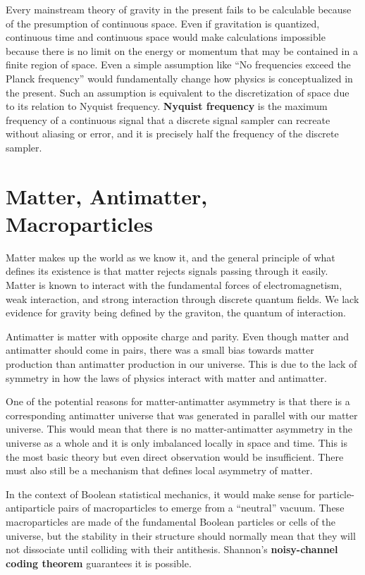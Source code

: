\documentclass[10pt, a5paper, twoside, openright]{memoir}
\begin{document}
Every mainstream theory of gravity in the present fails to be calculable because of the presumption of continuous space. Even if gravitation is quantized, continuous time and continuous space would make calculations impossible because there is no limit on the energy or momentum that may be contained in a finite region of space. Even a simple assumption like ``No frequencies exceed the Planck frequency'' would fundamentally change how physics is conceptualized in the present. Such an assumption is equivalent to the discretization of space due to its relation to Nyquist frequency. \textbf{Nyquist frequency} is the maximum frequency of a continuous signal that a discrete signal sampler can recreate without aliasing or error, and it is precisely half the frequency of the discrete sampler.

\section{Matter, Antimatter, Macroparticles}
Matter makes up the world as we know it, and the general principle of what defines its existence is that matter rejects signals passing through it easily. Matter is known to interact with the fundamental forces of electromagnetism, weak interaction, and strong interaction through discrete quantum fields. We lack evidence for gravity being defined by the graviton, the quantum of interaction.

Antimatter is matter with opposite charge and parity. Even though matter and antimatter should come in pairs, there was a small bias towards matter production than antimatter production in our universe. This is due to the lack of symmetry in how the laws of physics interact with matter and antimatter.

One of the potential reasons for matter-antimatter asymmetry is that there is a corresponding antimatter universe that was generated in parallel with our matter universe. This would mean that there is no matter-antimatter asymmetry in the universe as a whole and it is only imbalanced locally in space and time. This is the most basic theory but even direct observation would be insufficient. There must also still be a mechanism that defines local asymmetry of matter.

In the context of Boolean statistical mechanics, it would make sense for particle-antiparticle pairs of macroparticles to emerge from a ``neutral'' vacuum. These macroparticles are made of the fundamental Boolean particles or cells of the universe, but the stability in their structure should normally mean that they will not dissociate until colliding with their antithesis. Shannon's \textbf{noisy-channel coding theorem} guarantees it is possible.
\end{document}
